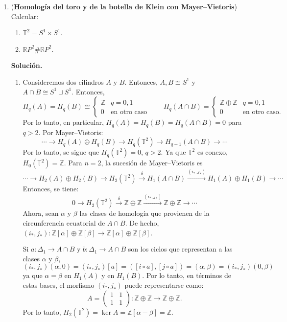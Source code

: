 \documentclass[11pt,a4paper]{article}
\theoremstyle{plain}
\theoremstyle{definition}
\theoremstyle{remark}
\newcommand{\RR}{\mathbb R}
\newcommand{\ZZ}{\mathbb Z}
\begin{document}
\begin{enumerate}[label=\arabic*.,leftmargin=*]
\item (\textbf{Homología del toro y de la botella de Klein con
Mayer--Vietoris}) Calcular:
\begin{enumerate}[label=\alph*)]
\item $\mathbb T^2=S^1\times S^1$.
\item $\RR P^2\#\RR P^2$.
\end{enumerate}

\noindent\textbf{Solución.}
\begin{enumerate}[label=\alph*)]
\item Consideremos dos cilindros $A$ y $B$. Entonces, $A,B\cong S^1$ y
$A\cap B\cong S^1\sqcup S^1$. Entonces,
\[
H_q(A)=H_q(B)\cong\begin{cases}\ZZ & q=0,1\\0 & \text{en otro caso}\end{cases}
\qquad
H_q(A\cap B)=\begin{cases}\ZZ\oplus\ZZ & q=0,1\\0 & \text{en otro caso.}\end{cases}
\]
Por lo tanto, en particular, $H_q(A)=H_q(B)=H_q(A\cap B)=0$ para $q>2$. Por
Mayer--Vietoris:
\[
\cdots\to H_q(A)\oplus H_q(B)\to H_q(\mathbb T^2)\to H_{q-1}(A\cap B)\to\cdots
\]
Por lo tanto, se sigue que $H_q(\mathbb T^2)=0$, $q>2$. Ya que $\mathbb T^2$
es conexo, $H_0(\mathbb T^2)=\ZZ$. Para $n=2$, la sucesión de
Mayer--Vietoris es
\[
\cdots\to H_2(A)\oplus H_2(B)\to H_2(\mathbb T^2)\xrightarrow{\delta}H_1(A\cap B)\xrightarrow{(i_*,j_*)}H_1(A)\oplus H_1(B)\to\cdots
\]
Entonces, se tiene:
\[
0\to H_2(\mathbb T^2)\xrightarrow{\delta}\ZZ\oplus\ZZ\xrightarrow{(i_*,j_*)}\ZZ\oplus\ZZ\to\cdots
\]
Ahora, sean $\alpha$ y $\beta$ las clases de homología que provienen de la
circunferencia ecuatorial de $A\cap B$. De hecho,
$(i_*,j_*):\ZZ[\alpha]\oplus\ZZ[\beta]\to\ZZ[\alpha]\oplus\ZZ[\beta]$.

Si $a:\Delta_1\to A\cap B$ y $b:\Delta_1\to A\cap B$ son los ciclos que
representan a las clases $\alpha$ y $\beta$,
\[
(i_*,j_*)(\alpha,0)=(i_*,j_*)[a]=([i\circ a],[j\circ a])=(\alpha,\beta)=(i_*,j_*)(0,\beta)
\]
ya que $\alpha=\beta$ en $H_1(A)$ y en $H_1(B)$. Por lo tanto, en términos
de estas bases, el morfismo $(i_*,j_*)$ puede representarse como:
\[
A=\begin{pmatrix}1&1\\1&1\end{pmatrix}:\ZZ\oplus\ZZ\to\ZZ\oplus\ZZ.
\]
Por lo tanto, $H_2(\mathbb T^2)=\ker A=\ZZ[\alpha-\beta]=\ZZ$.


\end{enumerate}
\end{enumerate}
\end{document}

